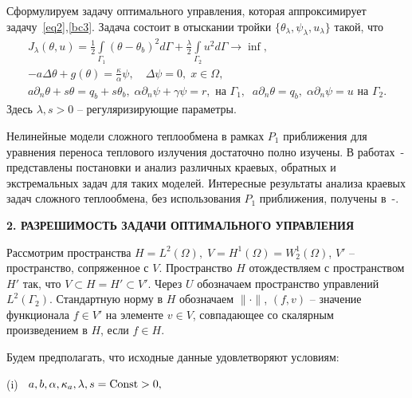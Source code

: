 \documentclass[12pt]{article}
\begin{document}
    Сформулируем задачу оптимального управления, которая аппроксимирует задачу~\eqref{eq2},\eqref{bc3}.
    Задача состоит в отыскании тройки $\{\theta_\lambda,\psi_\lambda,u_\lambda\}$ такой, что
    \begin{equation}
        \label{cost}
        \begin{split}
            J_\lambda(\theta, u) = \frac{1}{2}\int\limits_{\Gamma_1} (\theta - \theta_b)^2d\Gamma + \frac{\lambda}{2}\int\limits_{\Gamma_2} u^2d\Gamma \rightarrow\inf, \\
            - a \Delta \theta + g (\theta) = \frac{\kappa}{\alpha}\psi, \quad
            \Delta \psi = 0, \; x \in \Omega,\\
            a \partial_n \theta + s \theta = q_b + s\theta_b, \; \alpha \partial_n \psi + \gamma \psi = r, \text{ на } \Gamma_1,\;\; a \partial_n \theta  = q_b,\;
            \alpha \partial_n \psi = u \text{ на } \Gamma_2.
        \end{split}
    \end{equation}
    Здесь $\lambda, s > 0$ -- регуляризирующие параметры.


    Нелинейные модели сложного теплообмена в рамках $P_1$ приближения для уравнения переноса теплового
    излучения достаточно полно изучены.
    В работах~\cite{Pinnau07}-\cite{JVM-19-INV} представлены постановки и анализ различных краевых,
    обратных и экстремальных задач для таких моделей.
    Интересные результаты анализа краевых задач сложного теплообмена,
    без использования $P_1$ приближения, получены в~\cite{Amosov16}-\cite{Amosov20-1}.


    \begin{center}
        \textbf{2. РАЗРЕШИМОСТЬ ЗАДАЧИ ОПТИМАЛЬНОГО УПРАВЛЕНИЯ}
    \end{center}

    Рассмотрим пространства $H = L^2(\Omega), \; V = H^1(\Omega)=W^1_2(\Omega)$, $V'$ -- пространство, сопряженное с $V$.
    Пространство $H$ отождествляем с пространством $H'$ так, что $V \subset H = H' \subset V'$. Через $U$ обозначаем пространство управлений $L^2(\Gamma_2)$.
    Стандартную норму в $H$ обозначаем $\|\cdot\|$,
    $(f,v)$ -- значение функционала $f\in V'$ на элементе $v\in V$,
    совпадающее со скалярным произведением в $H$, если $f\in H$.


    Будем предполагать, что исходные данные удовлетворяют условиям:

    (i) $\;\; a,b,\alpha,\kappa_a, \lambda, s ={\rm Const}> 0 ,$
\end{document}
